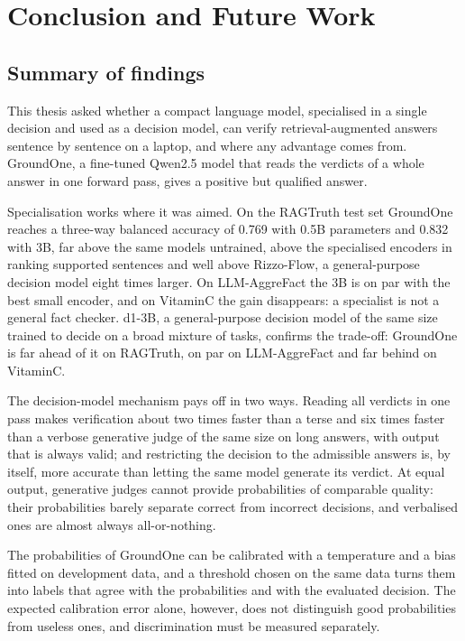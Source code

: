\chapter{Conclusion and Future Work}
\label{sec:conclusion}

\section{Summary of findings}
\label{sec:concl-summary}

This thesis asked whether a compact language model, specialised in a single decision and used as a decision model, can
verify retrieval-augmented answers sentence by sentence on a laptop, and where any advantage comes from. GroundOne, a
fine-tuned Qwen2.5 model that reads the verdicts of a whole answer in one forward pass, gives a positive but qualified
answer.

Specialisation works where it was aimed. On the RAGTruth test set GroundOne reaches a three-way balanced accuracy of
0.769 with 0.5B parameters and 0.832 with 3B, far above the same models untrained, above the specialised encoders in
ranking supported sentences and well above Rizzo-Flow, a general-purpose decision model eight times larger. On LLM-AggreFact the 3B is on
par with the best small encoder, and on VitaminC the gain disappears: a specialist is not a general fact checker. d1-3B,
a general-purpose decision model of the same size trained to decide on a broad mixture of tasks, confirms the trade-off:
GroundOne is far ahead of it on RAGTruth, on par on LLM-AggreFact and far behind on VitaminC.

The decision-model mechanism pays off in two ways. Reading all verdicts in one pass makes verification about two times
faster than a terse and six times faster than a verbose generative judge of the same size on long answers, with output
that is always valid; and restricting the decision to the admissible answers is, by itself, more accurate than letting
the same model generate its verdict. At equal output, generative judges cannot provide probabilities of comparable
quality: their probabilities barely separate correct from incorrect decisions, and verbalised ones are almost always
all-or-nothing.

The probabilities of GroundOne can be calibrated with a temperature and a bias fitted on development data, and a
threshold chosen on the same data turns them into labels that agree with the probabilities and with the evaluated
decision. The expected calibration error alone, however, does not distinguish good probabilities from useless ones, and
discrimination must be measured separately.

